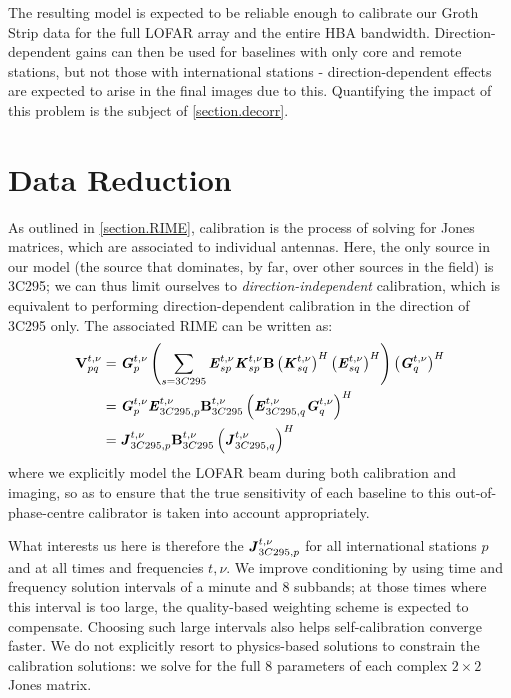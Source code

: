 \pg
The resulting model is expected to be reliable enough to calibrate our Groth Strip data for the full LOFAR array and the entire HBA bandwidth. Direction-dependent gains can then be used for baselines with only core and remote stations, but not those with international stations - direction-dependent effects are expected to arise in the final images due to this. Quantifying the impact of this problem is the subject of \cref{section.decorr}.

\section{Data Reduction}

\pg
As outlined in \cref{section.RIME}, calibration is the process of solving for Jones matrices, which are associated to individual antennas. Here, the only source in our model (the source that dominates, by far, over other sources in the field) is 3C295; we can thus limit ourselves to \textit{direction-independent} calibration, which is equivalent to performing direction-dependent calibration in the direction of 3C295 only. The associated RIME can be written as:
\begin{align}
\textbf{V}_{pq}^{t,\nu} &= \textbf{\emph{G}}_p^{t,\nu} \left( \sum_{s=3C295} \textbf{\emph{E}}_{sp}^{t,\nu} \textbf{\emph{K}}_{sp}^{t,\nu} \textbf{B} \left(\textbf{\emph{K}}_{sq}^{t,\nu}\right)^H \left(\textbf{\emph{E}}_{sq}^{t,\nu}\right)^H \right) \left(\textbf{\emph{G}}_q^{t,\nu}\right)^H\\
		  &= \textbf{\emph{G}}_p^{t,\nu} \textbf{\emph{E}}_{3C295,p}^{t,\nu} \textbf{B}_{3C295}^{t,\nu} \left(\textbf{\emph{E}}_{3C295,q}^{t,\nu} \textbf{\emph{G}}_q^{t,\nu}\right)^H\\
		  &= \textbf{\emph{J}}_{3C295,p}^{t,\nu} \textbf{B}_{3C295}^{t,\nu} \left(\textbf{\emph{J}}_{3C295,q}^{t,\nu}\right)^H
\end{align}
where we explicitly model the LOFAR beam during both calibration and imaging, so as to ensure that the true sensitivity of each baseline to this out-of-phase-centre calibrator is taken into account appropriately.

\pg
What interests us here is therefore the $\textbf{\emph{J}}_{3C295,p}^{t,\nu}$ for all international stations $p$ and at all times and frequencies $t,\nu$. We improve conditioning by using time and frequency solution intervals of a minute and 8 subbands; at those times where this interval is too large, the quality-based weighting scheme is expected to compensate. Choosing such large intervals also helps self-calibration converge faster. We do not explicitly resort to physics-based solutions to constrain the calibration solutions: we solve for the full 8 parameters of each complex $2\times 2$ Jones matrix.

